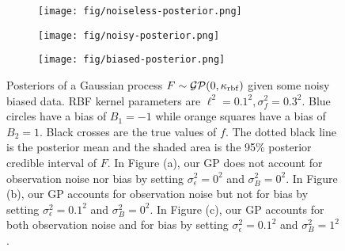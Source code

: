 \begin{figure}
    \centering
    \begin{subfigure}[b]{0.3\textwidth}
        \centering
        \texttt{[image: fig/noiseless-posterior.png]}
        \caption{}
        \label{subfig:noiseless-post}
    \end{subfigure}
    \hfill
    \begin{subfigure}[b]{0.3\textwidth}
        \centering
        \texttt{[image: fig/noisy-posterior.png]}
        \caption{}
        \label{subfig:noisy-posterior}
    \end{subfigure}
    \hfill
    \begin{subfigure}[b]{0.3\textwidth}
        \centering
        \texttt{[image: fig/biased-posterior.png]}
        \caption{}
        \label{subfig:biased-posterior}
    \end{subfigure}
    \hfill
    \caption{Posteriors of a Gaussian process $F \sim \mathcal{GP}(0, \kappa_{\mathrm{rbf}})$ given some noisy biased data.
    RBF kernel parameters are $\ell^{2} = 0.1^2, \sigma^2_{f} = 0.3 ^ 2$.
    Blue circles have a bias of $B_1 = -1$ while orange squares have a bias of $B_2 = 1$.
    Black crosses are the true values of $f$.
    The dotted black line is the posterior mean and the shaded area is the 95\% posterior credible interval of $F$.
    In Figure (a), our GP does not account for observation noise nor bias by setting $\sigma_{\epsilon}^2 = 0^2$ and $\sigma^2_B = 0^2$.
    In Figure (b), our GP accounts for observation noise but not for bias by setting $\sigma_{\epsilon}^2 = 0.1^2$ and $\sigma^2_B = 0^2$.
    In Figure (c), our GP accounts for both observation noise and for bias by setting $\sigma_{\epsilon}^2 = 0.1^2$ and $\sigma^2_B = 1^2$.
    }
    \label{fig:gp-posteriors}
\end{figure}

